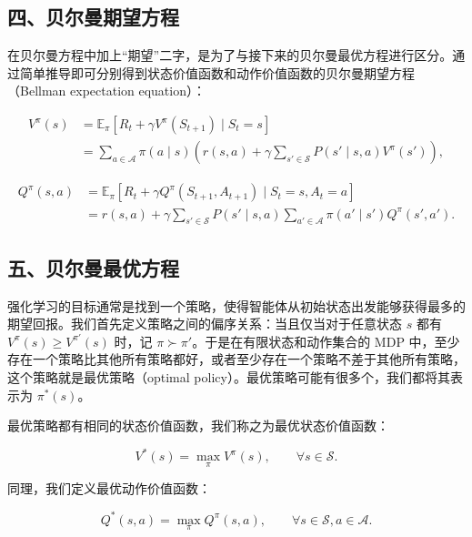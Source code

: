 \hypertarget{ux56dbux8d1dux5c14ux66fcux671fux671bux65b9ux7a0b}{%
\subsection{四、贝尔曼期望方程}\label{ux56dbux8d1dux5c14ux66fcux671fux671bux65b9ux7a0b}}

在贝尔曼方程中加上``期望''二字，是为了与接下来的贝尔曼最优方程进行区分。通过简单推导即可分别得到状态价值函数和动作价值函数的贝尔曼期望方程（Bellman expectation equation）：

\[
\begin{aligned}
V^{\pi}(s)
&=\mathbb{E}_{\pi}[R_t+\gamma V^{\pi}(S_{t+1})\mid S_t=s]\\
&=\sum_{a\in\mathcal{A}}\pi(a\mid s)
(r(s,a)+\gamma\sum_{s'\in\mathcal{S}}P(s'\mid s,a)V^{\pi}(s')),
\end{aligned}
\]

\[
\begin{aligned}
Q^{\pi}(s,a)
&=\mathbb{E}_{\pi}[R_t+\gamma Q^{\pi}(S_{t+1},A_{t+1})\mid S_t=s,A_t=a]\\
&=r(s,a)+\gamma\sum_{s'\in\mathcal{S}}P(s'\mid s,a)
\sum_{a'\in\mathcal{A}}\pi(a'\mid s')Q^{\pi}(s',a').
\end{aligned}
\]

\hypertarget{ux4e94ux8d1dux5c14ux66fcux6700ux4f18ux65b9ux7a0b}{%
\subsection{五、贝尔曼最优方程}\label{ux4e94ux8d1dux5c14ux66fcux6700ux4f18ux65b9ux7a0b}}

强化学习的目标通常是找到一个策略，使得智能体从初始状态出发能够获得最多的期望回报。我们首先定义策略之间的偏序关系：当且仅当对于任意状态 \(s\) 都有 \(V^{\pi}(s)\ge V^{\pi'}(s)\) 时，记 \(\pi\succ \pi'\)。于是在有限状态和动作集合的 MDP 中，至少存在一个策略比其他所有策略都好，或者至少存在一个策略不差于其他所有策略，这个策略就是最优策略（optimal policy）。最优策略可能有很多个，我们都将其表示为 \(\pi^{*}(s)\)。

最优策略都有相同的状态价值函数，我们称之为最优状态价值函数：

\[
V^{*}(s)=\max_{\pi}V^{\pi}(s),\qquad \forall s\in\mathcal{S}.
\]

同理，我们定义最优动作价值函数：

\[
Q^{*}(s,a)=\max_{\pi}Q^{\pi}(s,a),\qquad \forall s\in\mathcal{S},a\in\mathcal{A}.
\]


